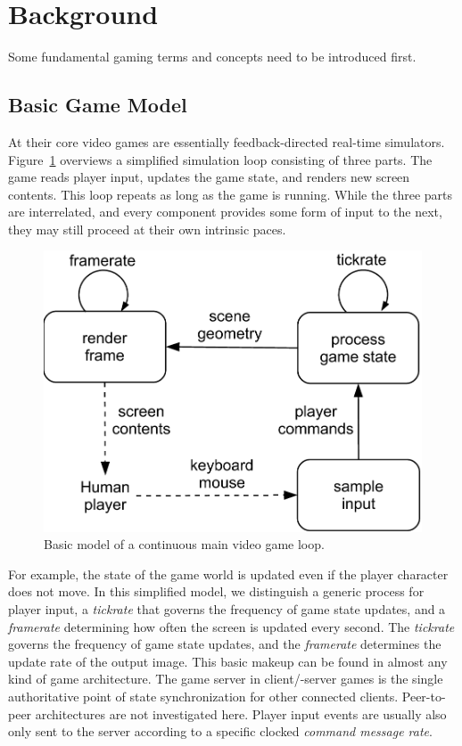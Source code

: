 \section{Background}
\label{sec:background}

Some fundamental gaming terms and concepts need to be introduced first.


\subsection{Basic Game Model}
\label{subsec:game-model}

At their core video games are essentially feedback-directed real-time simulators. Figure~\ref{fig:gameloop1} overviews a simplified simulation loop consisting of three parts. The game reads player input, updates the game state, and renders new screen contents. This loop repeats as long as the game is running. While the three parts are interrelated, and every component provides some form of input to the next, they may still proceed at their own intrinsic paces.


\begin{figure}[!t]
	\centering
	\includegraphics[width=0.8\columnwidth]{../../../models/game_loop.pdf}
	\caption{Basic model of a continuous main video game loop.}
	\label{fig:gameloop1}
\end{figure}

For example, the state of the game world is updated even if the player character does not move. In this simplified model, we distinguish a generic process for player input, a \textit{tickrate} that governs the frequency of game state updates, and a \textit{framerate} determining how often the screen is updated every second. The \textit{tickrate} governs the frequency of game state updates, and the \textit{framerate} determines the update rate of the output image. This basic makeup can be found in almost any kind of game architecture.
The game server in client/-server games is the single authoritative point of state synchronization for other connected clients. Peer-to-peer architectures are not investigated here. Player input events are usually also only sent to the server according to a specific clocked \textit{command message rate}.

